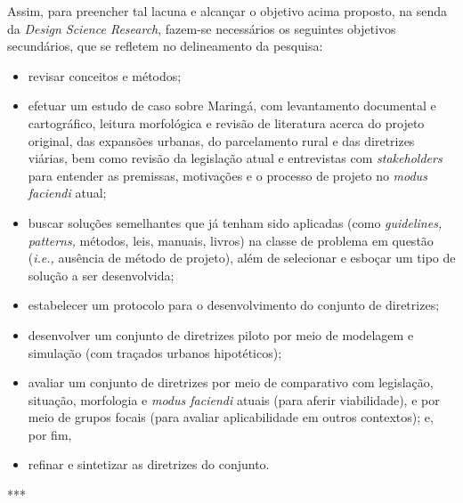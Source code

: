 \documentclass[]{report}
\begin{document}
	Assim, para preencher tal lacuna e alcançar o objetivo acima proposto, na senda da \textit{Design Science Research}, fazem-se necessários os seguintes objetivos secundários, que se refletem no delineamento da pesquisa: 
	\begin{itemize}
		\item revisar conceitos e métodos; 
		\item efetuar um estudo de caso sobre Maringá, com levantamento documental e cartográfico, leitura morfológica e revisão de literatura acerca do projeto original, das expansões urbanas, do parcelamento rural e das diretrizes viárias, bem como revisão da legislação atual e entrevistas com \textit{stakeholders} para entender as premissas, motivações e o processo de projeto no \textit{modus faciendi} atual; 
		\item buscar soluções semelhantes que já tenham sido aplicadas (como \textit{guidelines, patterns,} métodos, leis, manuais, livros) na classe de problema em questão (\textit{i.e.,} ausência de método de projeto), além de selecionar e esboçar um tipo de solução a ser desenvolvida;
		\item estabelecer um protocolo para o desenvolvimento do conjunto de diretrizes; 
		\item desenvolver um conjunto de diretrizes piloto por meio de modelagem e simulação (com traçados urbanos hipotéticos); 
		\item avaliar um conjunto de diretrizes por meio de comparativo com legislação, situação, morfologia e \textit{modus faciendi} atuais (para aferir viabilidade), e por meio de grupos focais (para avaliar aplicabilidade em outros contextos); e, por fim, 
		\item refinar e sintetizar as diretrizes do conjunto.
	\end{itemize}



	***

		
\end{document}
